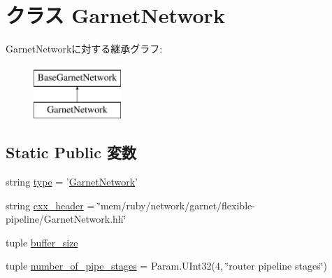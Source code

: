 \hypertarget{classGarnetNetwork_1_1GarnetNetwork}{
\section{クラス GarnetNetwork}
\label{classGarnetNetwork_1_1GarnetNetwork}
}
GarnetNetworkに対する継承グラフ:\begin{figure}[H]
\begin{center}
\leavevmode
\includegraphics[height=2cm]{classGarnetNetwork_1_1GarnetNetwork}
\end{center}
\end{figure}
\subsection*{Static Public 変数}
\begin{DoxyCompactItemize}
\item 
string \hyperlink{classGarnetNetwork_1_1GarnetNetwork_acce15679d830831b0bbe8ebc2a60b2ca}{type} = '\hyperlink{classGarnetNetwork_1_1GarnetNetwork}{GarnetNetwork}'
\item 
string \hyperlink{classGarnetNetwork_1_1GarnetNetwork_a17da7064bc5c518791f0c891eff05fda}{cxx\_\-header} = \char`\"{}mem/ruby/network/garnet/flexible-\/pipeline/GarnetNetwork.hh\char`\"{}
\item 
tuple \hyperlink{classGarnetNetwork_1_1GarnetNetwork_a0f14097399fa367505d7d06197f1498c}{buffer\_\-size}
\item 
tuple \hyperlink{classGarnetNetwork_1_1GarnetNetwork_a0eb24f94968edb05336733b58de25fcf}{number\_\-of\_\-pipe\_\-stages} = Param.UInt32(4, \char`\"{}router pipeline stages\char`\"{})
\end{DoxyCompactItemize}


